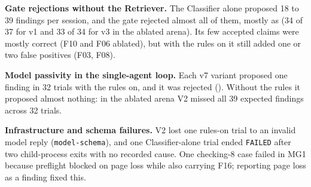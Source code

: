 \textbf{Gate rejections without the Retriever.} The Classifier alone proposed 18 to 39 findings per
session, and the gate rejected almost all of them, mostly as  (34 of 37
for v1 and 33 of 34 for v3 in the ablated arena). Its few accepted claims were mostly correct (F10
and F06 ablated), but with the rules on it still added one or two false positives (F03, F08).

\textbf{Model passivity in the single-agent loop.} Each v7 variant proposed one finding in 32
trials with the rules on, and it was rejected (). Without the rules
it proposed almost nothing: in the ablated arena V2 missed all 39 expected findings across 32
trials.

\textbf{Infrastructure and schema failures.} V2 lost one rules-on trial to an invalid model reply
(\texttt{model-schema}), and one Classifier-alone trial ended \texttt{FAILED} after two child-process
exits with no recorded cause. One checking-8 case failed in MG1 because preflight blocked on page
loss while also carrying F16; reporting page loss as a finding fixed this.
